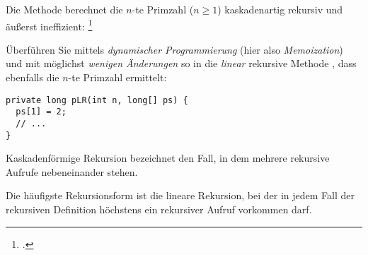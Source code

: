 \documentclass{bschlangaul-aufgabe}
\begin{document}

Die Methode  berechnet die $n$-te Primzahl ($n \geq 1$)
kaskadenartig rekursiv und äußerst ineffizient:
\footcite{examen:46115:2017:09}


\noindent
Überführen Sie  mittels \emph{dynamischer
Programmierung} (hier also \emph{Memoization}) und mit möglichst
\emph{wenigen Änderungen} so in die \emph{linear} rekursive Methode
, dass  ebenfalls
die $n$-te Primzahl ermittelt:

\begin{verbatim}
private long pLR(int n, long[] ps) {
  ps[1] = 2;
  // ...
}
\end{verbatim}

\begin{bAntwort}
\begin{bExkurs}
Kaskadenförmige Rekursion bezeichnet den Fall, in dem mehrere rekursive
Aufrufe nebeneinander stehen.
\end{bExkurs}

\begin{bExkurs}
Die häufigste Rekursionsform ist die lineare Rekursion, bei der in jedem
Fall der rekursiven Definition höchstens ein rekursiver Aufruf vorkommen
darf.
\end{bExkurs}



\end{bAntwort}
\end{document}
